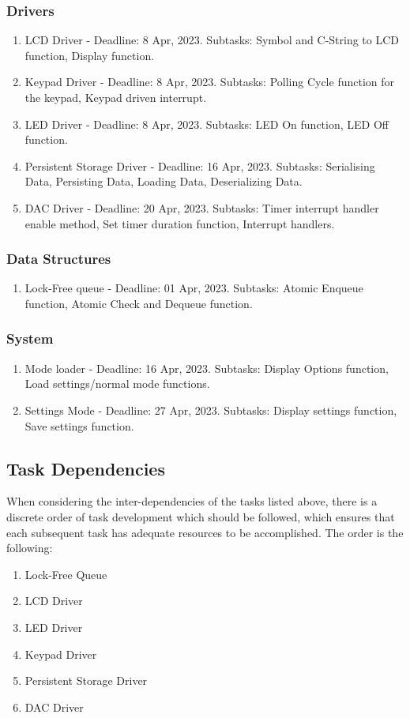\documentclass[11pt,a4paper,twocolumn]{scrartcl}
\begin{document}
\subsubsection{Drivers}
\begin{enumerate}
    \item LCD Driver - Deadline: 8 Apr, 2023. Subtasks: Symbol and C-String to LCD function, Display function.
    \item Keypad Driver - Deadline: 8 Apr, 2023. Subtasks: Polling Cycle function for the keypad, Keypad driven interrupt.
    \item LED Driver - Deadline: 8 Apr, 2023. Subtasks: LED On function, LED Off function.
    \item Persistent Storage Driver - Deadline: 16 Apr, 2023. Subtasks: Serialising Data, Persisting Data, Loading Data, Deserializing Data.
    \item DAC Driver - Deadline: 20 Apr, 2023. Subtasks: Timer interrupt handler enable method, Set timer duration function, Interrupt handlers.
\end{enumerate}

\subsubsection{Data Structures}
\begin{enumerate}
    \item Lock-Free queue - Deadline: 01 Apr, 2023. Subtasks: Atomic Enqueue function, Atomic Check and Dequeue function.
\end{enumerate}

\subsubsection{System}
\begin{enumerate}
    \item Mode loader - Deadline: 16 Apr, 2023. Subtasks: Display Options function, Load settings/normal mode functions.
    \item Settings Mode - Deadline: 27 Apr, 2023. Subtasks: Display settings function, Save settings function.
\end{enumerate}

\subsection{Task Dependencies}
When considering the inter-dependencies of the tasks listed above, there is a discrete order of task development which should be followed, which ensures that each subsequent task
has adequate resources to be accomplished. The order is the following:
\begin{enumerate}
    \item Lock-Free Queue
    \item LCD Driver
   \item LED Driver
   \item Keypad Driver
   \item Persistent Storage Driver
   \item DAC Driver
\end{enumerate}
\end{document}
